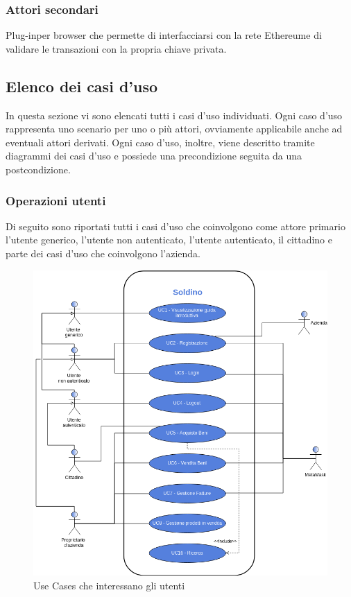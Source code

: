 \subsubsection{Attori secondari}
\begin{description}[style=nextline]
	\item[MetaMask]
	Plug-in\glosp per browser che permette di interfacciarsi con la rete Ethereum\glosp e di validare le transazioni con la propria chiave privata.
	
\end{description}

\subsection{Elenco dei casi d'uso}
In questa sezione vi sono elencati tutti i casi d'uso individuati. Ogni caso d'uso rappresenta uno scenario per uno o più attori, ovviamente applicabile anche ad eventuali attori derivati. Ogni caso d'uso, inoltre, viene descritto tramite diagrammi dei casi d'uso e possiede una precondizione seguita da una postcondizione.
\subsubsection*{Operazioni utenti}
Di seguito sono riportati tutti i casi d'uso che coinvolgono come attore primario l'utente generico, l'utente non autenticato, l'utente autenticato, il cittadino e parte dei casi d'uso che coinvolgono l'azienda.

\begin{figure}[H]
	\includegraphics[width=14cm]{res/images/UseCase1-8.png}
	\centering
	\caption{Use Cases che interessano gli utenti}
\end{figure}






\pagebreak
